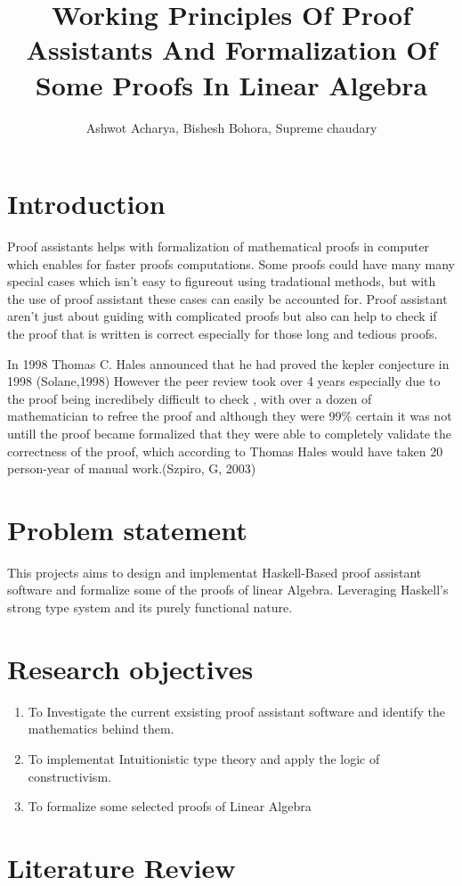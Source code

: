 \documentclass{article}
\author{ Ashwot Acharya, Bishesh Bohora, Supreme chaudary}
\title{Working Principles Of Proof Assistants And Formalization Of Some Proofs In Linear Algebra}
\begin{document}
\maketitle
\pagebreak
\section{Introduction}
Proof assistants helps with formalization of mathematical proofs in computer which enables for faster proofs computations.
Some proofs could have many many special cases which isn't easy to figureout using tradational methods, but with the use of proof assistant these cases can easily be accounted for.
Proof assistant aren't just about guiding with complicated proofs but also can help to check if the proof that is written is correct especially for those long and tedious proofs.

In 1998 Thomas C. Hales announced that he had proved the kepler conjecture in 1998 (Solane,1998) However the peer review took over 4 years especially due to the proof being incredibely difficult to check , with over a dozen of mathematician to refree the proof and although 
they were 99\% certain it was not untill the proof became formalized that they were able to completely validate the correctness of the proof, which according to Thomas Hales would have taken 20 person-year of manual work.(Szpiro, G, 2003)


\section{Problem statement}
This projects aims to design and implementat Haskell-Based proof assistant software and formalize some  of the proofs of linear Algebra. Leveraging Haskell's strong type system and its purely functional nature.
\section{Research objectives}
\begin{enumerate}
    \item To Investigate the current exsisting proof assistant software and identify the mathematics behind them.
    \item To implementat Intuitionistic type theory and apply the logic of constructivism.
    \item To formalize some selected proofs of Linear Algebra
\end{enumerate}
\section{Literature Review}
\end{document}
